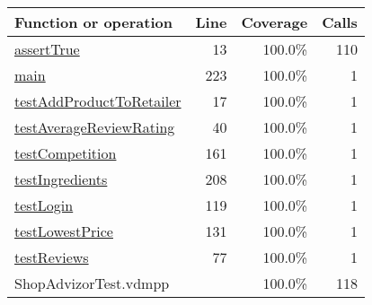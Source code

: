 \bigskip
\begin{longtable}{|l|r|r|r|}
\hline
Function or operation & Line & Coverage & Calls \\
\hline
\hline
\hyperref[assertTrue:13]{assertTrue} & 13&100.0\% & 110 \\
\hline
\hyperref[main:223]{main} & 223&100.0\% & 1 \\
\hline
\hyperref[testAddProductToRetailer:17]{testAddProductToRetailer} & 17&100.0\% & 1 \\
\hline
\hyperref[testAverageReviewRating:40]{testAverageReviewRating} & 40&100.0\% & 1 \\
\hline
\hyperref[testCompetition:161]{testCompetition} & 161&100.0\% & 1 \\
\hline
\hyperref[testIngredients:208]{testIngredients} & 208&100.0\% & 1 \\
\hline
\hyperref[testLogin:119]{testLogin} & 119&100.0\% & 1 \\
\hline
\hyperref[testLowestPrice:131]{testLowestPrice} & 131&100.0\% & 1 \\
\hline
\hyperref[testReviews:77]{testReviews} & 77&100.0\% & 1 \\
\hline
\hline
ShopAdvizorTest.vdmpp & & 100.0\% & 118 \\
\hline
\end{longtable}

